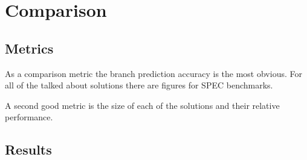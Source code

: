 
\section{Comparison}
\subsection{Metrics}
As a comparison metric the branch prediction accuracy is the most obvious.
For all of the talked about solutions there are figures for SPEC benchmarks.

A second good metric is the size of each of the solutions and their relative performance.
\subsection{Results}


